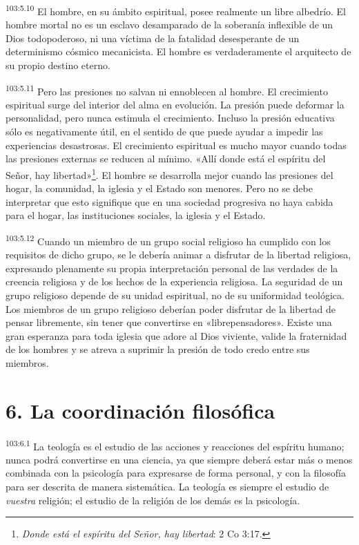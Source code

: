 \par
\textsuperscript{103:5.10} El hombre, en su ámbito espiritual, posee realmente un libre albedrío. El hombre mortal no es un esclavo desamparado de la soberanía inflexible de un Dios todopoderoso, ni una víctima de la fatalidad desesperante de un determinismo cósmico mecanicista. El hombre es verdaderamente el arquitecto de su propio destino eterno.

\par
\textsuperscript{103:5.11} Pero las presiones no salvan ni ennoblecen al hombre. El crecimiento espiritual surge del interior del alma en evolución. La presión puede deformar la personalidad, pero nunca estimula el crecimiento. Incluso la presión educativa sólo es negativamente útil, en el sentido de que puede ayudar a impedir las experiencias desastrosas. El crecimiento espiritual es mucho mayor cuando todas las presiones externas se reducen al mínimo. «Allí donde está el espíritu del Señor, hay libertad»\footnote{\textit{Donde está el espíritu del Señor, hay libertad}: 2 Co 3:17.}. El hombre se desarrolla mejor cuando las presiones del hogar, la comunidad, la iglesia y el Estado son menores. Pero no se debe interpretar que esto signifique que en una sociedad progresiva no haya cabida para el hogar, las instituciones sociales, la iglesia y el Estado.

\par
\textsuperscript{103:5.12} Cuando un miembro de un grupo social religioso ha cumplido con los requisitos de dicho grupo, se le debería animar a disfrutar de la libertad religiosa, expresando plenamente su propia interpretación personal de las verdades de la creencia religiosa y de los hechos de la experiencia religiosa. La seguridad de un grupo religioso depende de su unidad espiritual, no de su uniformidad teológica. Los miembros de un grupo religioso deberían poder disfrutar de la libertad de pensar libremente, sin tener que convertirse en «librepensadores». Existe una gran esperanza para toda iglesia que adore al Dios viviente, valide la fraternidad de los hombres y se atreva a suprimir la presión de todo credo entre sus miembros.

\section*{6. La coordinación filosófica}
\par
\textsuperscript{103:6.1} La teología es el estudio de las acciones y reacciones del espíritu humano; nunca podrá convertirse en una ciencia, ya que siempre deberá estar más o menos combinada con la psicología para expresarse de forma personal, y con la filosofía para ser descrita de manera sistemática. La teología es siempre el estudio de \textit{vuestra} religión; el estudio de la religión de los demás es la psicología.

